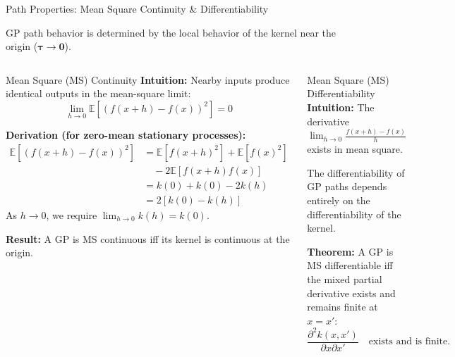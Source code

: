 \documentclass[aspectratio=169, 10pt]{beamer}
\begin{document}
\begin{frame}{Path Properties: Mean Square Continuity \& Differentiability}
  
  GP path behavior is determined by the local behavior of the kernel near the origin ($\boldsymbol{\tau} \to \mathbf{0}$).
  
  \begin{columns}[t]
      \begin{block}{Mean Square (MS) Continuity}
        \scriptsize
        \textbf{Intuition:} Nearby inputs produce identical outputs in the mean-square limit:
        \[
          \lim_{h \to 0} \mathbb{E}\left[(f(x+h) - f(x))^2\right] = 0
        \]
        
        \textbf{Derivation (for zero-mean stationary processes):}
        \begin{align*}
          \mathbb{E}\left[(f(x+h) - f(x))^2\right] &= \mathbb{E}[f(x+h)^2] + \mathbb{E}[f(x)^2] \\
          &\quad - 2\mathbb{E}[f(x+h)f(x)] \\
          &= k(0) + k(0) - 2k(h) \\
          &= 2[k(0) - k(h)]
        \end{align*}
        As $h \to 0$, we require $\lim_{h \to 0} k(h) = k(0)$.
        \vspace{4.5pt}
        
        \textbf{Result:} A GP is MS continuous iff its kernel is continuous at the origin.
      \end{block}
      
      \begin{block}{Mean Square (MS) Differentiability}
        \scriptsize
        \textbf{Intuition:} The derivative $\lim_{h \to 0} \frac{f(x+h) - f(x)}{h}$ exists in mean square.
        \vspace{4pt}
        
        The differentiability of GP paths depends entirely on the differentiability of the kernel.
        \vspace{4pt}
        
        \textbf{Theorem:} A GP is MS differentiable iff the mixed partial derivative exists and remains finite at $x = x'$:
        \[
          \frac{\partial^{2} k(x, x')}{\partial x \partial x'} \quad \text{exists and is finite.}
        \]
      \end{block}
  \end{columns}
\end{frame}
\end{document}
